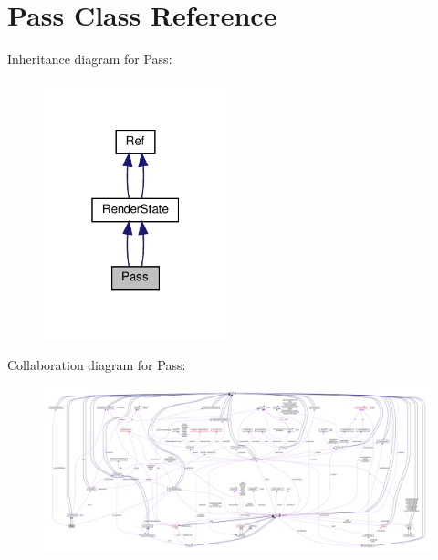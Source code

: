 \hypertarget{classPass}{}\section{Pass Class Reference}
\label{classPass}


Inheritance diagram for Pass\+:
\nopagebreak
\begin{figure}[H]
\begin{center}
\leavevmode
\includegraphics[width=151pt]{classPass__inherit__graph}
\end{center}
\end{figure}


Collaboration diagram for Pass\+:
\nopagebreak
\begin{figure}[H]
\begin{center}
\leavevmode
\includegraphics[width=350pt]{classPass__coll__graph}
\end{center}
\end{figure}
